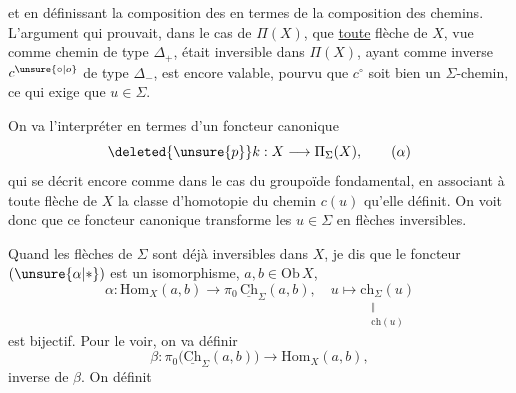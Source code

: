 et en définissant la composition des  en termes de la composition des chemins.
L'argument qui prouvait,  dans le cas de $\Pi(X)$, que \uline{toute} flèche  de $X$, vue comme chemin  de type $\Delta_+$, était inversible dans $\Pi(X)$,  ayant comme inverse $c^{\unsure{\circ|o}}$ de type $\Delta_-$, est encore valable, pourvu que $c^\circ$ soit  bien un $\Sigma$-chemin, ce qui exige que $u\in\Sigma$. 

On va l'interpréter en termes d'un foncteur canonique
\[\deleted{\unsure{p}}k:X\longrightarrow\Pi_\Sigma(X),\tag*{$(\alpha)$}\]
qui se décrit encore comme dans le cas du groupoïde fondamental, en associant à toute flèche  de $X$ la classe d'homotopie du chemin $c(u)$ qu'elle définit. On voit donc que ce foncteur canonique transforme les $u\in\Sigma$ en flèches inversibles.

Quand les flèches de $\Sigma$ sont déjà inversibles dans $X$, je dis que le foncteur $(\unsure{\alpha|*})$ est un isomorphisme,  $a,b\in\mathrm{Ob}\,X$,
\[\alpha:\mathrm{Hom}_X(a,b)\longrightarrow\pi_0\,\underline{\mathrm{Ch}}_\Sigma(a,b),\quad u\longmapsto\underset{\substack{\Vert\\\mathrm{ch}(u)}}{\mathrm{ch}_\Sigma(u)}\]
est bijectif. Pour le voir, on va définir
\[\beta:\pi_0\bigl(\underline{\mathrm{Ch}}_\Sigma(a,b)\bigr)\longrightarrow\mathrm{Hom}_X(a,b),\]
 inverse de $\beta$. On définit
